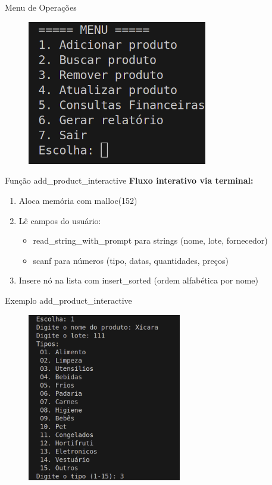 \documentclass{beamer}
\begin{document}
\begin{frame}{Menu de Operações}
    \begin{figure}
        \centering
        \includegraphics[width=0.7\textwidth]{img/menu-inicial.png}
    \end{figure}
\end{frame}

\begin{frame}{Função add\_product\_interactive}
    \textbf{Fluxo interativo via terminal:}
    \begin{enumerate}
        \item Aloca memória com malloc(152)
        \item Lê campos do usuário:
        \begin{itemize}
            \item read\_string\_with\_prompt para strings (nome, lote, fornecedor)
            \item scanf para números (tipo, datas, quantidades, preços)
        \end{itemize}
        \item Insere nó na lista com insert\_sorted (ordem alfabética por nome)
    \end{enumerate}
\end{frame}

\begin{frame}{Exemplo add\_product\_interactive}
    \begin{figure}
        \centering
        \includegraphics[width=0.6\textwidth]{img/add-1.png}
    \end{figure}
\end{frame}
\end{document}
